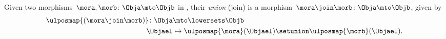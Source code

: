 \begin{definition} \label{def:union-morph-Lpos}
    Given two morphisms~$\mora,\morb\colon \Obja \mto \Objb$ in \LPos, their \emph{union} (join) is a morphism~$\mora \join \morb \colon \Obja \mto \Objb$, given by
    \begin{equation}
        \begin{aligned}
            \ulposmap{(\mora \join \morb)}\colon \Obja & \mto \lowersets \Objb \\
            \Objael                                    & \mapsto \ulposmap{\mora}(\Objael) \setunion \ulposmap{\morb}(\Objael).
        \end{aligned}
    \end{equation}
\end{definition}

